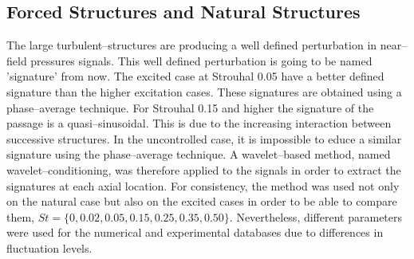 \documentclass[english]{aiaa-tc}
\begin{document}
\subsection{Forced Structures and Natural Structures}%
The large turbulent--structures are producing a well defined perturbation in near--field pressures signals.
This well defined perturbation is going to be named 'signature' from now. The excited case at Strouhal 0.05 have a better defined signature
than the higher excitation cases. These signatures are obtained using a phase--average technique. For Strouhal 0.15
and higher the signature of the passage is a quasi--sinusoidal. This is due to the increasing interaction
between successive structures. In the uncontrolled case, it is impossible to educe a similar signature
using the phase--average technique. A wavelet--based method, named wavelet--conditioning, was therefore applied to the signals in order to extract the signatures at each axial location.
For consistency, the method was used not only on the natural case but also on the excited cases in order to be able to compare them, $St = \{0, 0.02, 0.05, 0.15, 0.25, 0.35, 0.50\}$.
Nevertheless, different parameters were used for the numerical and experimental databases due to differences in fluctuation levels.
\end{document}
